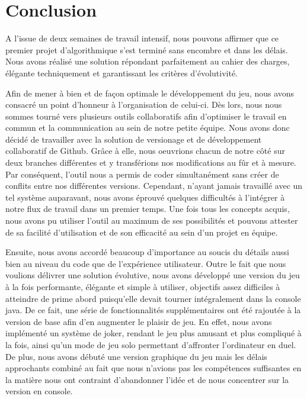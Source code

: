 \documentclass[11pt,a4paper]{report}
\begin{document}
        \chapter{Conclusion}
A l'issue de deux semaines de travail intensif, nous pouvons affirmer que ce premier projet d'algorithmique s’est terminé sans encombre et dans les délais. Nous avons réalisé une solution répondant parfaitement au cahier des charges, élégante techniquement et garantissant les critères d’évolutivité.
\par
Afin de mener à bien et de façon optimale le développement du jeu, nous avons consacré un point d'honneur à l’organisation de celui-ci. Dès lors, nous nous sommes tourné vers plusieurs outils collaboratifs afin d’optimiser le travail en commun et la communication au sein de notre petite équipe. Nous avons donc décidé de travailler avec la solution de versionage et de développement collaboratif de Github. Grâce à elle, nous oeuvrions chacun de notre côté sur deux branches différentes et y transférions nos modifications au fûr et à mesure. Par conséquent, l'outil nous a permis de coder simultanément sans créer de conflits entre nos différentes versions.\newline
Cependant, n'ayant jamais travaillé avec un tel système auparavant, nous avons éprouvé quelques difficultés à l’intégrer à notre flux de travail dans un premier temps. Une fois tous les concepts acquis, nous avons pu utiliser l’outil au maximum de ses possibilités et pouvons attester de sa facilité d’utilisation et de son efficacité au sein d’un projet en équipe.
\par
Ensuite, nous avons accordé beaucoup d’importance au soucis du détails aussi bien au niveau du code que de l’expérience utilisateur. Outre le fait que nous voulions délivrer une solution évolutive, nous avons développé une version du jeu à la fois performante, élégante et simple à utiliser, objectifs assez difficiles à atteindre de prime abord puisqu'elle devait tourner intégralement dans la console java. De ce fait, une série de fonctionnalités supplémentaires ont été rajoutée à la version de base afin d’en augmenter le plaisir de jeu. En effet, nous avons implémenté un système de joker, rendant le jeu plus amusant et plus compliqué à la fois, ainsi qu’un mode de jeu solo permettant d’affronter l’ordinateur en duel.\newline
De plus, nous avons débuté une version graphique du jeu mais les délais approchants combiné au fait que nous n'avions pas les compétences suffisantes en la matière nous ont contraint d’abandonner l’idée et de nous concentrer sur la version en console.
\end{document}
